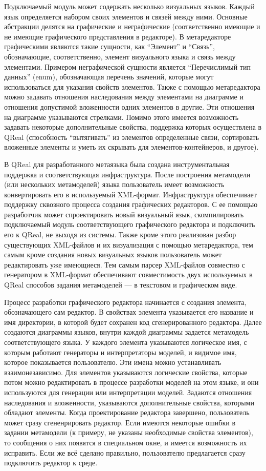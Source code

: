 \documentclass[a4paper]{article}
\begin{document}
Подключаемый модуль может содержать несколько визуальных языков. Каждый язык определяется набором своих элементов и связей между ними. Основные абстракции делятся на графические и неграфические (соответственно имеющие и не имеющие графического представления в редакторе). В метаредакторе графическими являются такие сущности, как ``Элемент''  и ``Связь'', обозначающие, соответственно, элемент визуального языка и связь между элементами. Примером неграфической сущности является ``Перечислимый тип данных'' (enum), обозначающая перечень значений, которые могут использоваться для указания свойств элементов. Также с помощью метаредактора можно задавать отношения наследования между элементами на диаграмме и отношения допустимой вложенности одних элементов в другие. Эти отношения на диаграмме указываются стрелками. Помимо этого имеется возможность задавать некоторые дополнительные свойства, поддержка которых осуществлена в QReal (способность “вытягивать” из элементов определенные связи, сортировать вложенные элементы и уметь их скрывать для элементов-контейнеров, и другое). 

В QReal для разработанного метаязыка была создана инструментальная поддержка и соответствующая инфраструктура. После построения метамодели (или нескольких метамоделей) языка пользователь имеет возможность конвертировать его в используемый XML-формат. Инфраструктура обеспечивает поддержку сквозного процесса создания графических редакторов. С ее помощью разработчик может спроектировать новый визуальный язык, скомпилировать подключаемый модуль соответствующего графического редактора и подключить его к QReal, не выходя из системы. Также кроме этого реализован разбор существующих XML-файлов и их визуализация с помощью метаредактора, тем самым кроме создания новых визуальных языков пользователь может редактировать уже имеющиеся. Тем самым парсер XML-файлов совместно с генератором в XML-формат обеспечивают совместимость двух используемых в QReal способов задания метамоделей --- в текстовом и графическом виде.

Процесс разработки графического редактора начинается с создания элемента, обозначающего сам редактор. В свойствах элемента указывается его название и имя директории, в которой будет сохранен код сгенерированного редактора. Далее создаются диаграммы языков, внутри каждой диаграммы задается метамодель соответствующего языка. У каждого элемента указываются логическое имя, с которым работают генераторы и интерпретаторы моделей, и видимое имя, которое показывается пользователю. Эти имена можно устанавливать взаимонезависимо. Для элементов указываются логические свойства, которые потом можно редактировать в процессе разработки моделей на этом языке, и они используются для генерации или интерпретации моделей. Задаются отношения наследования и вложенности, указываются дополнительные свойства, которыми обладают элементы. Когда проектирование редактора завершено, пользователь может сразу сгененрировать редактор. Если имеются некоторые ошибки в задании метамодели (к примеру, не указаны необходимые свойства элементов), то сообщения о них появятся в специальном окне, и имеется возможность их исправить. Если же всё сделано правильно, пользователю предлагается сразу подключить редактор к среде.  
\end{document}
